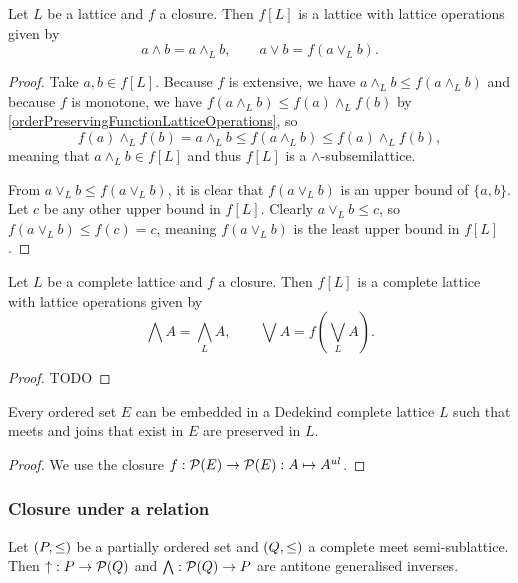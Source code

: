 \begin{proposition}
Let $L$ be a lattice and $f$ a closure. Then $f[L]$ is a lattice with lattice operations given by
\[ a\wedge b = a\wedge_L b, \qquad a\vee b = f(a\vee_L b). \]
\end{proposition}
\begin{proof}
Take $a,b\in f[L]$. Because $f$ is extensive, we have $a\wedge_L b \leq f(a\wedge_L b)$ and because $f$ is monotone, we have $f(a\wedge_L b)\leq f(a)\wedge_L f(b)$ by \ref{orderPreservingFunctionLatticeOperations}, so
\[ f(a)\wedge_L f(b) = a\wedge_L b \leq f(a\wedge_L b) \leq f(a)\wedge_L f(b), \]
meaning that $a\wedge_L b \in f[L]$ and thus $f[L]$ is a $\wedge$-subsemilattice.

From $a\vee_L b \leq f(a\vee_L b)$, it is clear that $f(a\vee_L b)$ is an upper bound of $\{a,b\}$. Let $c$ be any other upper bound in $f[L]$. Clearly $a\vee_L b \leq c$, so $f(a\vee_L b) \leq f(c) = c$, meaning $f(a\vee_L b)$ is the least upper bound in $f[L]$.
\end{proof}
\begin{proposition} \label{completeLatticeOperationsUnderClosure}
Let $L$ be a complete lattice and $f$ a closure. Then $f[L]$ is a complete lattice with lattice operations given by
\[ \bigwedge A = {\bigwedge}_L A, \qquad \bigvee A = f({\bigvee}_L A). \]
\end{proposition}
\begin{proof}
TODO
\end{proof}

\begin{theorem}
Every ordered set $E$ can be embedded in a Dedekind complete lattice $L$ such that meets and joins that exist in $E$ are preserved in $L$.
\end{theorem}
\begin{proof}
We use the closure $f: \operatorname{\mathcal{P}}(E) \to \operatorname{\mathcal{P}}(E): A\mapsto A^{ul}$.
\end{proof}

\subsubsection{Closure under a relation}

\begin{proposition}
Let $\left( P, \leq \right)$ be a partially ordered set and $\left( Q, \leq \right)$ a complete meet semi-sublattice. Then $\operatorname{\uparrow}: P \to \operatorname{\mathcal{P}}(Q)$ and $\bigwedge: \operatorname{\mathcal{P}}(Q) \to P$ are antitone generalised inverses. 
\end{proposition}


